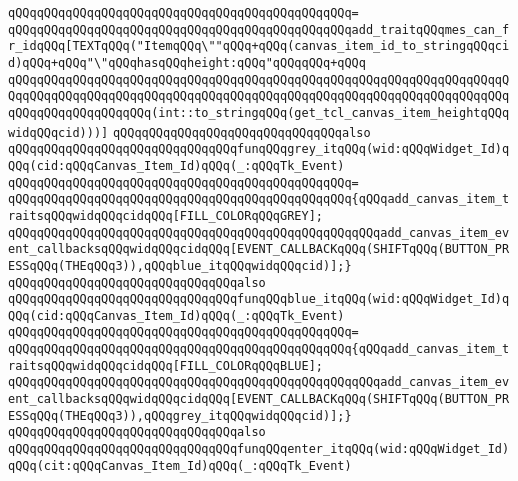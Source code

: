 \verb|qQQqqQQqqQQqqQQqqQQqqQQqqQQqqQQqqQQqqQQqqQQqqQQq=|\newline
\verb|qQQqqQQqqQQqqQQqqQQqqQQqqQQqqQQqqQQqqQQqqQQqqQQqadd_traitqQQqmes_can_fr_idqQQq[TEXTqQQq("ItemqQQq\""qQQq+qQQq(canvas_item_id_to_stringqQQqcid)qQQq+qQQq"\"qQQqhasqQQqheight:qQQq"qQQqqQQq+qQQq|\newline
\verb|qQQqqQQqqQQqqQQqqQQqqQQqqQQqqQQqqQQqqQQqqQQqqQQqqQQqqQQqqQQqqQQqqQQqqQQqqQQqqQQqqQQqqQQqqQQqqQQqqQQqqQQqqQQqqQQqqQQqqQQqqQQqqQQqqQQqqQQqqQQqqQQqqQQqqQQqqQQqqQQq(int::to_stringqQQq(get_tcl_canvas_item_heightqQQqwidqQQqcid)))]|\newline
\newline
\verb|qQQqqQQqqQQqqQQqqQQqqQQqqQQqqQQqalso|\newline
\verb|qQQqqQQqqQQqqQQqqQQqqQQqqQQqqQQqfunqQQqgrey_itqQQq(wid:qQQqWidget_Id)qQQq(cid:qQQqCanvas_Item_Id)qQQq(_:qQQqTk_Event)|\newline
\verb|qQQqqQQqqQQqqQQqqQQqqQQqqQQqqQQqqQQqqQQqqQQqqQQq=|\newline
\verb|qQQqqQQqqQQqqQQqqQQqqQQqqQQqqQQqqQQqqQQqqQQqqQQq{qQQqadd_canvas_item_traitsqQQqwidqQQqcidqQQq[FILL_COLORqQQqGREY];|\newline
\verb|qQQqqQQqqQQqqQQqqQQqqQQqqQQqqQQqqQQqqQQqqQQqqQQqqQQqadd_canvas_item_event_callbacksqQQqwidqQQqcidqQQq[EVENT_CALLBACKqQQq(SHIFTqQQq(BUTTON_PRESSqQQq(THEqQQq3)),qQQqblue_itqQQqwidqQQqcid)];}|\newline
\newline
\verb|qQQqqQQqqQQqqQQqqQQqqQQqqQQqqQQqalso|\newline
\verb|qQQqqQQqqQQqqQQqqQQqqQQqqQQqqQQqfunqQQqblue_itqQQq(wid:qQQqWidget_Id)qQQq(cid:qQQqCanvas_Item_Id)qQQq(_:qQQqTk_Event)|\newline
\verb|qQQqqQQqqQQqqQQqqQQqqQQqqQQqqQQqqQQqqQQqqQQqqQQq=|\newline
\verb|qQQqqQQqqQQqqQQqqQQqqQQqqQQqqQQqqQQqqQQqqQQqqQQq{qQQqadd_canvas_item_traitsqQQqwidqQQqcidqQQq[FILL_COLORqQQqBLUE];|\newline
\verb|qQQqqQQqqQQqqQQqqQQqqQQqqQQqqQQqqQQqqQQqqQQqqQQqqQQqadd_canvas_item_event_callbacksqQQqwidqQQqcidqQQq[EVENT_CALLBACKqQQq(SHIFTqQQq(BUTTON_PRESSqQQq(THEqQQq3)),qQQqgrey_itqQQqwidqQQqcid)];}|\newline
\newline
\verb|qQQqqQQqqQQqqQQqqQQqqQQqqQQqqQQqalso|\newline
\verb|qQQqqQQqqQQqqQQqqQQqqQQqqQQqqQQqfunqQQqenter_itqQQq(wid:qQQqWidget_Id)qQQq(cit:qQQqCanvas_Item_Id)qQQq(_:qQQqTk_Event)|\newline
